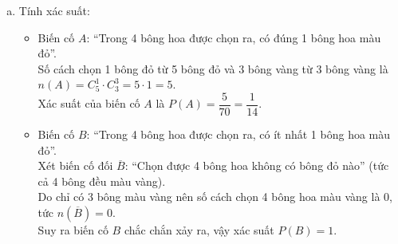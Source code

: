 \begin{bt}
{\begin{enumerate}[a)]
    Số phần tử của không gian mẫu là $n(\Omega) = C_8^4 = 70$.
    \item Tính xác suất:
    \begin{itemize}
        \item Biến cố $A$: “Trong 4 bông hoa được chọn ra, có đúng 1 bông hoa màu đỏ”.\\
        Số cách chọn 1 bông đỏ từ 5 bông đỏ và 3 bông vàng từ 3 bông vàng là $n(A) = C_5^1 \cdot C_3^3 = 5 \cdot 1 = 5$.\\
        Xác suất của biến cố $A$ là $P(A) = \dfrac{5}{70} = \dfrac{1}{14}$.
        \item Biến cố $B$: “Trong 4 bông hoa được chọn ra, có ít nhất 1 bông hoa màu đỏ”.\\
        Xét biến cố đối $\overline{B}$: “Chọn được 4 bông hoa không có bông đỏ nào” (tức cả 4 bông đều màu vàng).\\
        Do chỉ có 3 bông màu vàng nên số cách chọn 4 bông hoa màu vàng là $0$, tức $n(\overline{B}) = 0$.\\
        Suy ra biến cố $B$ chắc chắn xảy ra, vậy xác suất $P(B) = 1$.
    \end{itemize}
\end{enumerate}
}
\end{bt}

